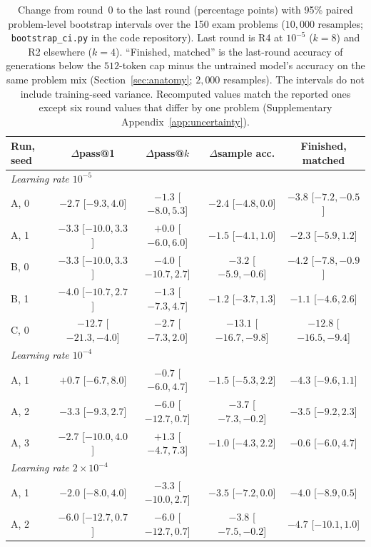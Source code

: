 \documentclass[runningheads]{llncs}
\begin{document}
\begin{table}[!htb]
\caption{Change from round~0 to the last round (percentage points) with 95\%
paired problem-level bootstrap intervals over the 150 exam problems
($10{,}000$ resamples; \texttt{bootstrap\_ci.py} in the code repository). Last round
is R4 at $10^{-5}$ ($k=8$) and R2 elsewhere ($k=4$). ``Finished, matched'' is
the last-round accuracy of generations below the $512$-token cap minus the
untrained model's accuracy on the same problem mix (Section~\ref{sec:anatomy};
$2{,}000$ resamples). The
intervals do not include training-seed variance. Recomputed values match the
reported ones except six round values that differ by one problem
(Supplementary Appendix~\ref{app:uncertainty}).}
\label{tab:ci}
\centering
\scriptsize
\setlength{\tabcolsep}{1.5pt}
\begin{tabular}{lcccc}
\toprule
Run, seed & $\Delta$pass@1 & $\Delta$pass@$k$ & $\Delta$sample acc. & Finished, matched \\
\midrule
\multicolumn{5}{l}{\emph{Learning rate $10^{-5}$}} \\
A, 0 & $-2.7$ [$-9.3,4.0$] & $-1.3$ [$-8.0,5.3$] & $-2.4$ [$-4.8,0.0$] & $-3.8$ [$-7.2,-0.5$] \\
A, 1 & $-3.3$ [$-10.0,3.3$] & $+0.0$ [$-6.0,6.0$] & $-1.5$ [$-4.1,1.0$] & $-2.3$ [$-5.9,1.2$] \\
B, 0 & $-3.3$ [$-10.0,3.3$] & $-4.0$ [$-10.7,2.7$] & $-3.2$ [$-5.9,-0.6$] & $-4.2$ [$-7.8,-0.9$] \\
B, 1 & $-4.0$ [$-10.7,2.7$] & $-1.3$ [$-7.3,4.7$] & $-1.2$ [$-3.7,1.3$] & $-1.1$ [$-4.6,2.6$] \\
C, 0 & $-12.7$ [$-21.3,-4.0$] & $-2.7$ [$-7.3,2.0$] & $-13.1$ [$-16.7,-9.8$] & $-12.8$ [$-16.5,-9.4$] \\
\midrule
\multicolumn{5}{l}{\emph{Learning rate $10^{-4}$}} \\
A, 1 & $+0.7$ [$-6.7,8.0$] & $-0.7$ [$-6.0,4.7$] & $-1.5$ [$-5.3,2.2$] & $-4.3$ [$-9.6,1.1$] \\
A, 2 & $-3.3$ [$-9.3,2.7$] & $-6.0$ [$-12.7,0.7$] & $-3.7$ [$-7.3,-0.2$] & $-3.5$ [$-9.2,2.3$] \\
A, 3 & $-2.7$ [$-10.0,4.0$] & $+1.3$ [$-4.7,7.3$] & $-1.0$ [$-4.3,2.2$] & $-0.6$ [$-6.0,4.7$] \\
\multicolumn{5}{l}{\emph{Learning rate $2\!\times\!10^{-4}$}} \\
A, 1 & $-2.0$ [$-8.0,4.0$] & $-3.3$ [$-10.0,2.7$] & $-3.5$ [$-7.2,0.0$] & $-4.0$ [$-8.9,0.5$] \\
A, 2 & $-6.0$ [$-12.7,0.7$] & $-6.0$ [$-12.7,0.7$] & $-3.8$ [$-7.5,-0.2$] & $-4.7$ [$-10.1,1.0$] \\

\end{tabular}
\end{table}
\end{document}
